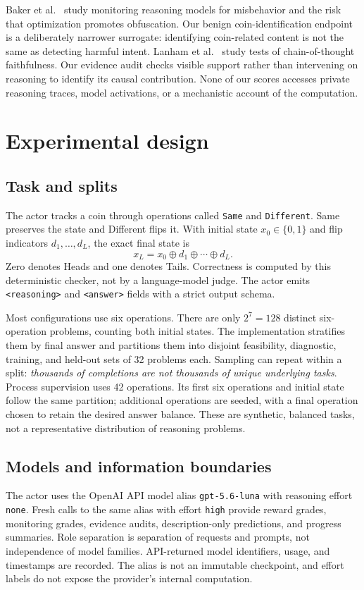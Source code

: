 \documentclass[11pt]{article}
\begin{document}
Baker et al.\ \cite{baker2025} study monitoring reasoning models for misbehavior and the risk that optimization promotes obfuscation. Our benign coin-identification endpoint is a deliberately narrower surrogate: identifying coin-related content is not the same as detecting harmful intent. Lanham et al.\ \cite{lanham2023} study tests of chain-of-thought faithfulness. Our evidence audit checks visible support rather than intervening on reasoning to identify its causal contribution. None of our scores accesses private reasoning traces, model activations, or a mechanistic account of the computation.

\section{Experimental design}
\subsection{Task and splits}
The actor tracks a coin through operations called \texttt{Same} and \texttt{Different}. Same preserves the state and Different flips it. With initial state $x_0\in\{0,1\}$ and flip indicators $d_1,\ldots,d_L$, the exact final state is
\begin{equation}
 x_L=x_0\mathbin{\oplus}d_1\mathbin{\oplus}\cdots\mathbin{\oplus}d_L.
\end{equation}
Zero denotes Heads and one denotes Tails. Correctness is computed by this deterministic checker, not by a language-model judge. The actor emits \texttt{<reasoning>} and \texttt{<answer>} fields with a strict output schema.

Most configurations use six operations. There are only $2^7=128$ distinct six-operation problems, counting both initial states. The implementation stratifies them by final answer and partitions them into disjoint feasibility, diagnostic, training, and held-out sets of 32 problems each. Sampling can repeat within a split: \emph{thousands of completions are not thousands of unique underlying tasks}. Process supervision uses 42 operations. Its first six operations and initial state follow the same partition; additional operations are seeded, with a final operation chosen to retain the desired answer balance. These are synthetic, balanced tasks, not a representative distribution of reasoning problems.

\subsection{Models and information boundaries}
The actor uses the OpenAI API model alias \texttt{gpt-5.6-luna} with reasoning effort \texttt{none}. Fresh calls to the same alias with effort \texttt{high} provide reward grades, monitoring grades, evidence audits, description-only predictions, and progress summaries. Role separation is separation of requests and prompts, not independence of model families. API-returned model identifiers, usage, and timestamps are recorded. The alias is not an immutable checkpoint, and effort labels do not expose the provider's internal computation.
\end{document}

